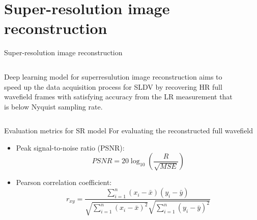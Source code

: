 \documentclass[10pt,aspectratio=169,dvipsnames]{beamer} %
\begin{document}
	\section{Super-resolution image reconstruction}
	\begin{frame}{Super-resolution image reconstruction}
		\begin{columns}[T]
			\begin{column}[c]{0.35\textwidth}
				\justifying	
				\small	
				Deep learning model for superresulution image reconstruction aims to speed up the data acquisition process for SLDV by recovering HR full wavefield frames with satisfying accuracy from the LR measurement that is below Nyquist sampling rate.				
			\end{column}
			\begin{column}[c]{0.6\textwidth}
				\begin{figure}
				\end{figure}
			\end{column}
		\end{columns}
	\end{frame}
	\begin{frame}{Evaluation metrics for SR model}
		For evaluating the reconstructed full wavefield
		\begin{itemize}
			\item Peak signal-to-noise ratio (PSNR):
			\begin{equation*}
				PSNR=20\log_{10}\left(\frac{R}{\sqrt{MSE}}\right)
				\label{PSNR}
			\end{equation*}
			\item Pearson correlation coefficient:
			\begin{equation*}
				r_{xy} = \frac{\sum_{i=1}^{n}(x_i - \bar{x})(y_i-\bar{y})}{\sqrt{\sum_{i=1}^{n}(x_i - \bar{x})^2}\sqrt{\sum_{i=1}^{n}(y_i - \bar{y})^2}}
				\label{Pearson}
			\end{equation*}
		\end{itemize}
	\end{frame}
\end{document}
